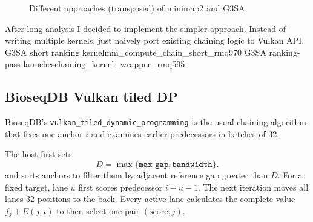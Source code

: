 \begin{figure}[H]
\caption{Different approaches (transposed) of minimap2 and G3SA}
\label{fig:chaining-work-split}
\end{figure}

After long analysis I decided to implement the simpler approach. Instead of writing multiple kernels, just naively port existing chaining logic to Vulkan API.
\leavevmode{}
  {G3SA short ranking kernel}{mm_compute_chain_short_rmq}{970}
\leavevmode{}
  {G3SA ranking-pass launches}{chaining_kernel_wrapper_rmq}{595}

\subsection{BioseqDB Vulkan tiled DP}
\label{sec:chaining-vulkan}

BioseqDB's \texttt{vulkan\_tiled\_dynamic\_programming} is the usual chaining algorithm that fixes one anchor \(i\) and examines earlier predecessors in
batches of 32.

The host first sets
\[
  D=\max\{\texttt{max\_gap},\texttt{bandwidth}\}.
\]
and sorts anchors to filter them by adjacent reference gap greater than \(D\).
For a fixed target, lane \(u\) first scores predecessor \(i-u-1\).  The next
iteration moves all lanes 32 positions to the back.  Every active lane
calculates the complete value \(f_j+E(j,i)\) to then select one
pair \((\text{score},j)\).

